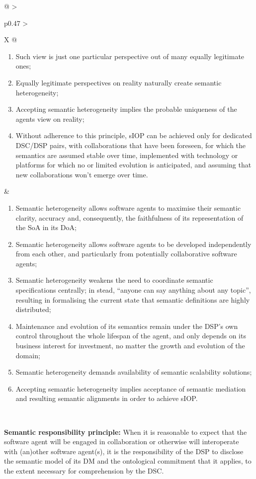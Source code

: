 \begin{xltabular}[l]{\linewidth}{@{} >{\small\raggedright\arraybackslash}p{0.47\linewidth} >{\small\raggedright\arraybackslash}X @{}}
\begin{enumerate}[left=6pt, nosep]
  \item Such view is just one particular perspective out of many equally legitimate ones;
  \item Equally legitimate perspectives on reality naturally create semantic heterogeneity;
  \item Accepting semantic heterogeneity implies the probable uniqueness of the agents view on reality;
  \item Without adherence to this principle, sIOP can be achieved only for dedicated DSC/DSP pairs, with collaborations that have been foreseen, for which the semantics are assumed stable over time, implemented with technology or platforms for which no or limited evolution is anticipated, and assuming that new collaborations won't emerge over time.
\end{enumerate}
&
\begin{enumerate}[left=10pt, nosep]
  \item Semantic heterogeneity allows software agents to maximise their semantic clarity, accuracy and, consequently, the faithfulness of its representation of the SoA in its DoA;
  \item Semantic heterogeneity allows software agents to be developed independently from each other, and particularly from potentially collaborative software agents;
  \item Semantic heterogeneity weakens the need to coordinate semantic specifications centrally; in stead, “anyone can say anything about any topic”, resulting in formalising the current state that semantic definitions are highly distributed;
  \item Maintenance and evolution of its semantics remain under the DSP’s own control throughout the whole lifespan of the agent, and only depends on its business interest for investment, no matter the growth and evolution of the domain;
  \item Semantic heterogeneity demands availability of semantic scalability solutions;
  \item Accepting semantic heterogeneity implies acceptance of semantic mediation and resulting semantic alignments in order to achieve sIOP.
\end{enumerate} \\
%
%
%
\begin{mmdp}\label{dp:srp}{\bfseries Semantic responsibility principle:}
\quad When it is reasonable to expect that the software agent will be engaged in collaboration or otherwise will interoperate with (an)other software agent(s), it is the responsibility of the DSP to disclose the semantic model of its DM and the ontological commitment that it applies, to the extent necessary for comprehension by the DSC.

\end{mmdp}
\end{xltabular}
